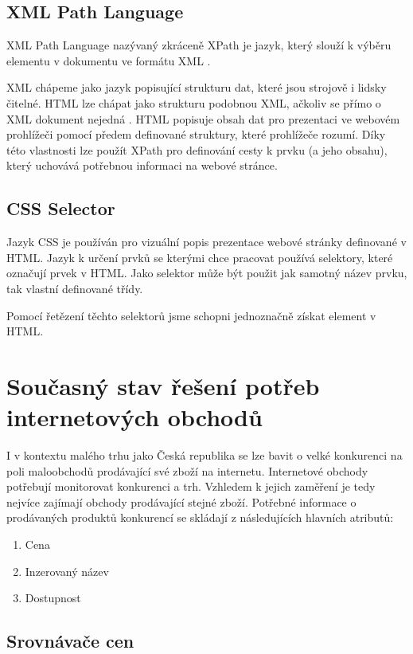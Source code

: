 \documentclass[thesis=B,czech]{FITthesis}[2012/06/26]
\begin{document}
\subsection{XML Path Language}
XML Path Language\cite{XPath} nazývaný zkráceně XPath je jazyk, který slouží k výběru elementu v dokumentu ve formátu XML\cite{XML} .
\par
XML chápeme jako jazyk popisující strukturu dat, které jsou strojově i lidsky čitelné.
HTML lze chápat jako strukturu podobnou XML, ačkoliv se přímo o XML dokument nejedná \cite{HTML}. HTML popisuje obsah dat pro prezentaci ve webovém prohlížeči pomocí předem definované struktury, které prohlížeče rozumí.
Díky této vlastnosti lze použít XPath pro definování cesty k prvku (a jeho obsahu),
který uchovává potřebnou informaci na webové stránce.
\par
\subsection{CSS Selector}
Jazyk CSS je používán pro vizuální popis prezentace webové stránky definované v HTML. Jazyk k určení prvků se kterými
chce pracovat používá selektory, které označují prvek v HTML. Jako selektor může být použit jak samotný název prvku,
tak vlastní definované třídy.\cite{CSS}
\par
Pomocí řetězení těchto selektorů jsme schopni jednoznačně získat element v HTML.

\newpage

\section{Současný stav řešení potřeb internetových obchodů}
I v kontextu malého trhu jako Česká republika se lze bavit o velké konkurenci na poli 
maloobchodů prodávající své zboží na internetu.
Internetové obchody potřebují monitorovat konkurenci a trh. Vzhledem k jejich zaměření je tedy nejvíce zajímají 
obchody prodávající stejné zboží. Potřebné informace o prodávaných produktů konkurencí 
se skládají z následujících hlavních atributů:

\begin{enumerate}
\item Cena
\item Inzerovaný název
\item Dostupnost
\end{enumerate}

\subsection{Srovnávače cen}
\end{document}

